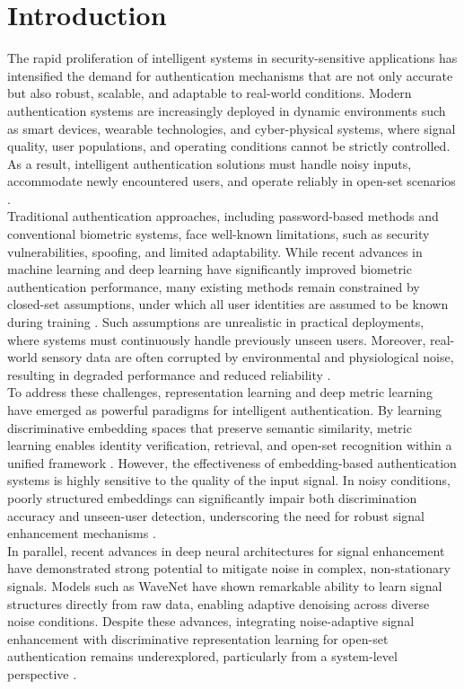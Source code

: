 \documentclass[a4paper,conference]{IEEEtran}
\begin{document}
	\section{Introduction}
	The rapid proliferation of intelligent systems in security-sensitive applications has intensified the demand for authentication mechanisms that are not only accurate but also robust, scalable, and adaptable to real-world conditions. Modern authentication systems are increasingly deployed in dynamic environments such as smart devices, wearable technologies, and cyber-physical systems, where signal quality, user populations, and operating conditions cannot be strictly controlled. As a result, intelligent authentication solutions must handle noisy inputs, accommodate newly encountered users, and operate reliably in open-set scenarios \cite{Fallahi2023, Yang2022, Zhang2017}.\\
	Traditional authentication approaches, including password-based methods and conventional biometric systems, face well-known limitations, such as security vulnerabilities, spoofing, and limited adaptability. While recent advances in machine learning and deep learning have significantly improved biometric authentication performance, many existing methods remain constrained by closed-set assumptions, under which all user identities are assumed to be known during training \cite{Fallahi2023, Yang2022, Zhang2017}. Such assumptions are unrealistic in practical deployments, where systems must continuously handle previously unseen users. Moreover, real-world sensory data are often corrupted by environmental and physiological noise, resulting in degraded performance and reduced reliability \cite{Alzahab2024, Fallahi2023}.\\
	To address these challenges, representation learning and deep metric learning have emerged as powerful paradigms for intelligent authentication. By learning discriminative embedding spaces that preserve semantic similarity, metric learning enables identity verification, retrieval, and open-set recognition within a unified framework \cite{Hadsell2006, Schroff2015,Wang2019,Deng2019}. However, the effectiveness of embedding-based authentication systems is highly sensitive to the quality of the input signal. In noisy conditions, poorly structured embeddings can significantly impair both discrimination accuracy and unseen-user detection, underscoring the need for robust signal enhancement mechanisms \cite{Fallahi2023,Alzahab2024}.\\
	In parallel, recent advances in deep neural architectures for signal enhancement have demonstrated strong potential to mitigate noise in complex, non-stationary signals. Models such as WaveNet have shown remarkable ability to learn signal structures directly from raw data, enabling adaptive denoising across diverse noise conditions\cite{vanDenOord2016}. Despite these advances, integrating noise-adaptive signal enhancement with discriminative representation learning for open-set authentication remains underexplored, particularly from a system-level perspective \cite{Fallahi2023,Yang2022}.\\
\end{document}
